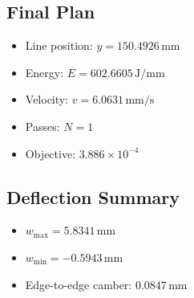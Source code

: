 \documentclass[11pt]{article}
\begin{document}
\subsection{Final Plan}
\begin{itemize}
  \item Line position: $y=150.4926\,\mathrm{mm}$
  \item Energy: $E=602.6605\,\mathrm{J/mm}$
  \item Velocity: $v=6.0631\,\mathrm{mm/s}$
  \item Passes: $N=1$
  \item Objective: $3.886\times 10^{-4}$
\end{itemize}

\subsection{Deflection Summary}
\begin{itemize}
  \item $w_{\max}=5.8341\,\mathrm{mm}$
  \item $w_{\min}=-0.5943\,\mathrm{mm}$
  \item Edge-to-edge camber: $0.0847\,\mathrm{mm}$
\end{itemize}
\end{document}

